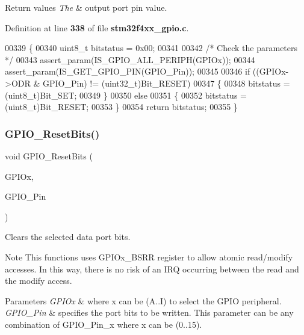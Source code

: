 \begin{DoxyRetVals}{Return values}
{\em The} & output port pin value. \\
\hline
\end{DoxyRetVals}


Definition at line \textbf{ 338} of file \textbf{ stm32f4xx\+\_\+gpio.\+c}.


\begin{DoxyCode}
00339 \{
00340   uint8\_t bitstatus = 0x00;
00341 
00342   \textcolor{comment}{/* Check the parameters */}
00343   assert_param(IS_GPIO_ALL_PERIPH(GPIOx));
00344   assert_param(IS_GET_GPIO_PIN(GPIO\_Pin));
00345 
00346   \textcolor{keywordflow}{if} ((GPIOx->ODR & GPIO\_Pin) != (uint32\_t)Bit_RESET)
00347   \{
00348     bitstatus = (uint8\_t)Bit_SET;
00349   \}
00350   \textcolor{keywordflow}{else}
00351   \{
00352     bitstatus = (uint8\_t)Bit\_RESET;
00353   \}
00354   \textcolor{keywordflow}{return} bitstatus;
00355 \}
\end{DoxyCode}
\mbox{\label{group__GPIO__Group2_ga6fcd35b207a66608dd2c9d7de9247dc8}} 
\subsubsection{G\+P\+I\+O\+\_\+\+Reset\+Bits()}
{\footnotesize\ttfamily void G\+P\+I\+O\+\_\+\+Reset\+Bits (\begin{DoxyParamCaption}\item[{\textbf{ G\+P\+I\+O\+\_\+\+Type\+Def} $\ast$}]{G\+P\+I\+Ox,  }\item[{uint16\+\_\+t}]{G\+P\+I\+O\+\_\+\+Pin }\end{DoxyParamCaption})}



Clears the selected data port bits. 

\begin{DoxyNote}{Note}
This functions uses G\+P\+I\+Ox\+\_\+\+B\+S\+RR register to allow atomic read/modify accesses. In this way, there is no risk of an I\+RQ occurring between the read and the modify access. 
\end{DoxyNote}

\begin{DoxyParams}{Parameters}
{\em G\+P\+I\+Ox} & where x can be (A..I) to select the G\+P\+IO peripheral. \\
\hline
{\em G\+P\+I\+O\+\_\+\+Pin} & specifies the port bits to be written. This parameter can be any combination of G\+P\+I\+O\+\_\+\+Pin\+\_\+x where x can be (0..15). \\
\hline
\end{DoxyParams}

